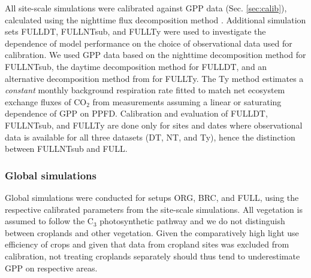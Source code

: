 \documentclass[gmd, manuscript]{copernicus}
\begin{document}
All site-scale simulations were calibrated against GPP data (Sec. \ref{sec:calib}), calculated using the nighttime flux decomposition method \citep{Reichstein2005-mp}. Additional simulation sets FULL\textunderscore DT, FULL\textunderscore NTsub, and FULL\textunderscore Ty were used to investigate the dependence of model performance on the choice of observational data used for calibration. We used GPP data based on the nighttime decomposition method \citep{Reichstein2005-mp} for FULL\textunderscore NTsub, the daytime decomposition method \citep{lasslop10} for FULL\textunderscore DT, and an alternative decomposition method from \citet{wang17natpl} for FULL\textunderscore Ty. The Ty method estimates a \textit{constant} monthly background respiration rate fitted to match net ecosystem exchange fluxes of CO$_2$ from measurements assuming a linear or saturating dependence of GPP on PPFD. Calibration and evaluation of FULL\textunderscore DT, FULL\textunderscore NTsub, and FULL\textunderscore Ty are done only for sites and dates where observational data is available for all three datasets (DT, NT, and Ty), hence the distinction between FULL\textunderscore NTsub and FULL. 

\subsubsection{Global simulations}

Global simulations were conducted for setups ORG, BRC, and FULL, using the respective calibrated parameters from the site-scale simulations. All vegetation is assumed to follow the C$_3$ photosynthetic pathway and we do not distinguish between croplands and other vegetation. Given the comparatively high light use efficiency of crops \citep{guanter14pnas} and given that data from cropland sites was excluded from calibration, not treating croplands separately should thus tend to underestimate GPP on respective areas.
\end{document}
